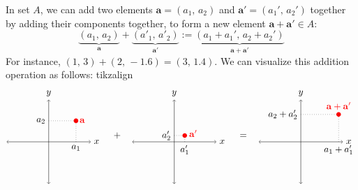 \documentclass[a4paper,11pt]{book}
\theoremstyle{definition}
\newcommand{\be}{\begin{equation}}
\newcommand{\ee}{\end{equation}}
\newcommand{\ve}[1]{\mathbf{#1}}
\begin{document}
In set $A$, we can add two elements $\ve{a} = (a_1, \, a_2)$ and $\ve{a}' = (a_1', \, a_2')$ together by adding their components together, to form a new element $\ve{a} + \ve{a}' \in A$:
\be \label{add_in_A}
 \underbrace{(a_1, \, a_2)}_{\ve{a}} + \underbrace{(a'_1, \,a'_2)}_{\ve{a}'} := \underbrace{(a_1 + a_1', \, a_2 + a_2')}_{\ve{a} + \ve{a}'}
\ee
For instance, $(1, \,3) + (2, \,-1.6) = (3, \,1.4)$. We can visualize this addition operation as follows:
tikzalign
\begin{align*}
\begin{tikzpicture}[baseline={([yshift=-.5ex]current bounding box.center)},vertex/.style={anchor=base,
	circle,fill=black!25,minimum size=18pt,inner sep=2pt}, scale=0.8]
\draw[<->] (-2, 0) -- (2,0) node[right] {$x$};
\draw[<->] (0, -2) -- (0, 2) node[above] {$y$};
\node [circle, fill=black, inner sep=0pt, minimum size=5pt, color=red] (P) at (1.3, 1) {};
\draw[dotted] (1.3, 0) node[below] {$a_1$} -- (1.3, 1);
\draw[dotted] (0, 1) node[left] {$a_2$} -- (1.3, 1);
\node[color=red] at (1.6,1) {$\ve{a}$};
\end{tikzpicture}
\quad + \quad
\begin{tikzpicture}[baseline={([yshift=-.5ex]current bounding box.center)},vertex/.style={anchor=base,
	circle,fill=black!25,minimum size=18pt,inner sep=2pt}, scale=0.8]
\draw[<->] (-2, 0) -- (2,0) node[right] {$x$};
\draw[<->] (0, -2) -- (0, 2) node[above] {$y$};
\node [circle, fill=black, inner sep=0pt, minimum size=5pt, color=red] (P) at (0.5, 0.3) {};
\draw[dotted] (0.5, 0) node[below] {$a'_1$} -- (0.5, 0.3);
\draw[dotted] (0, 0.3) node[left] {$a'_2$} -- (0.5, 0.3);
\node[color=red] at (0.9,0.4) {$\ve{a}'$};
\end{tikzpicture}
\quad = \quad
\begin{tikzpicture}[baseline={([yshift=-.5ex]current bounding box.center)},vertex/.style={anchor=base,
	circle,fill=black!25,minimum size=18pt,inner sep=2pt}, scale=0.8]
\draw[<->] (-2, 0) -- (2,0) node[right] {$x$};
\draw[<->] (0, -2) -- (0, 2) node[above] {$y$};
\node [circle, fill=black, inner sep=0pt, minimum size=5pt, color=red] (P) at (1.8, 1.3) {};
\draw[dotted] (1.8, 0) node[below] {$a_1+ a'_1$} -- (1.8, 1.3);
\draw[dotted] (0, 1.3) node[left] {$a_2 + a'_2$} -- (1.8, 1.3);
\node[color=red] at (1.8,1.7) {$\ve{a} + \ve{a}'$};
\end{tikzpicture}
\end{align*}
\end{document}

